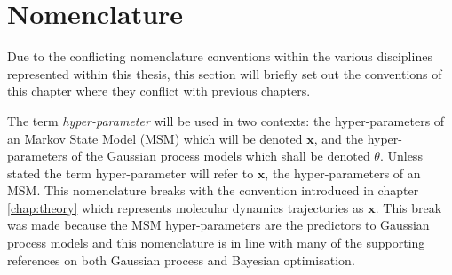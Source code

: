


\section{Nomenclature}
Due to the conflicting nomenclature conventions within the various disciplines represented within this thesis, this section will briefly set out the conventions of this chapter where they conflict with previous chapters. 

The term \emph{hyper-parameter} will be used in two contexts:  the hyper-parameters of an Markov State Model (MSM) which will be denoted $\mathbf{x}$, and the hyper-parameters of the Gaussian process models which shall be denoted $\theta$. Unless stated the term hyper-parameter will refer to $\mathbf{x}$, the hyper-parameters of an MSM. This nomenclature breaks with the convention introduced in chapter \ref{chap:theory} which represents molecular dynamics trajectories as $\mathbf{x}$. This break was made because the MSM hyper-parameters are the predictors to Gaussian process models and this nomenclature is in line with many of the supporting references on both Gaussian process and Bayesian optimisation. 

